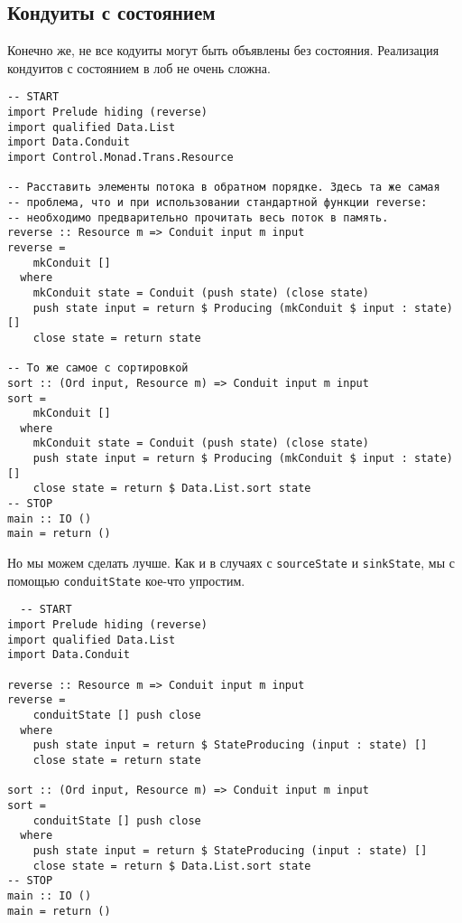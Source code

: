 \subsection{Кондуиты с состоянием}
Конечно же, не все кодуиты могут быть объявлены без состояния.  Реализация 
кондуитов с состоянием в лоб не очень сложна.
\begin{lstlisting}
-- START
import Prelude hiding (reverse)
import qualified Data.List
import Data.Conduit
import Control.Monad.Trans.Resource

-- Расставить элементы потока в обратном порядке. Здесь та же самая
-- проблема, что и при использовании стандартной функции reverse:
-- необходимо предварительно прочитать весь поток в память.
reverse :: Resource m => Conduit input m input
reverse =
    mkConduit []
  where
    mkConduit state = Conduit (push state) (close state)
    push state input = return $ Producing (mkConduit $ input : state) []
    close state = return state

-- То же самое с сортировкой
sort :: (Ord input, Resource m) => Conduit input m input
sort =
    mkConduit []
  where
    mkConduit state = Conduit (push state) (close state)
    push state input = return $ Producing (mkConduit $ input : state) []
    close state = return $ Data.List.sort state
-- STOP
main :: IO ()
main = return ()
\end{lstlisting} 
Но мы можем сделать лучше. Как и в случаях с \lstinline'sourceState' и 
\lstinline'sinkState', мы с помощью \lstinline'conduitState' кое-что упростим.
\begin{lstlisting}
  -- START
import Prelude hiding (reverse)
import qualified Data.List
import Data.Conduit

reverse :: Resource m => Conduit input m input
reverse =
    conduitState [] push close
  where
    push state input = return $ StateProducing (input : state) []
    close state = return state

sort :: (Ord input, Resource m) => Conduit input m input
sort =
    conduitState [] push close
  where
    push state input = return $ StateProducing (input : state) []
    close state = return $ Data.List.sort state
-- STOP
main :: IO ()
main = return ()
\end{lstlisting}

